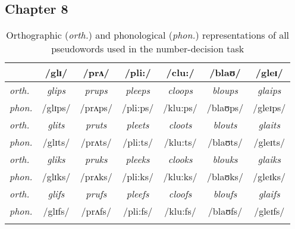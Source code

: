 \subsection{Chapter 8}


\begin{table}[H]\fontsize{10}{11}
\caption{Orthographic (\textit{orth.}) and phonological (\textit{phon.}) representations of all pseudowords used in the number-decision task}
\label{tab:8.1}
\centering
\begin{tabular}{lcccccc} 
\lsptoprule
~              & /glɪ/          & /prʌ/          & /pli:/          & /clu:/          & /blaʊ/          & /gleɪ/           \\ 
\midrule
\textit{orth.} & \textit{glips} & \textit{prups} & \textit{pleeps} & \textit{cloops} & \textit{bloups} & \textit{glaips}  \\
\textit{phon.} & /glɪps/        & /prʌps/        & /pli:ps/        & /klu:ps/        & /blaʊps/        & /gleɪps/         \\ 
\midrule
\textit{orth.} & \textit{glits} & \textit{pruts} & \textit{pleets} & \textit{cloots} & \textit{blouts} & \textit{glaits}  \\
\textit{phon.} & /glɪts/        & /prʌts/        & /pli:ts/        & /klu:ts/        & /blaʊts/        & /gleɪts/         \\ 
\midrule
\textit{orth.} & \textit{gliks} & \textit{pruks} & \textit{pleeks} & \textit{clooks} & \textit{blouks} & \textit{glaiks}  \\
\textit{phon.} & /glɪks/        & /prʌks/        & /pli:ks/        & /klu:ks/        & /blaʊks/        & /gleɪks/         \\ 
\midrule
\textit{orth.} & \textit{glifs} & \textit{prufs} & \textit{pleefs} & \textit{cloofs} & \textit{bloufs} & \textit{glaifs}  \\
\textit{phon.} & /glɪfs/        & /prʌfs/        & /pli:fs/        & /klu:fs/        & /blaʊfs/        & /gleɪfs/         \\
\lspbottomrule
\end{tabular}
\end{table}



\clearpage


